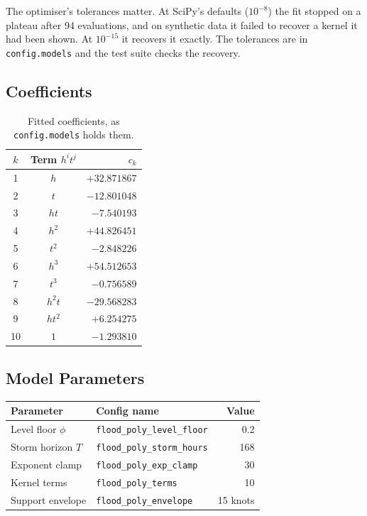 \documentclass[11pt,a4paper]{article}
\begin{document}
The optimiser's tolerances matter. At SciPy's defaults ($10^{-8}$) the fit stopped on a
plateau after 94 evaluations, and on synthetic data it failed to recover a kernel it
had been shown. At $10^{-15}$ it recovers it exactly. The tolerances are in
\texttt{config.models} and the test suite checks the recovery.

\subsection{Coefficients}
\begin{table}[ht]\centering\begin{tabular}{c|c|r}
$k$ & Term $h^i t^j$ & $c_k$ \\ \hline
1 & $h$ & $+32.871867$ \\
2 & $t$ & $-12.801048$ \\
3 & $h t$ & $-7.540193$ \\
4 & $h^2$ & $+44.826451$ \\
5 & $t^2$ & $-2.848226$ \\
6 & $h^3$ & $+54.512653$ \\
7 & $t^3$ & $-0.756589$ \\
8 & $h^2 t$ & $-29.568283$ \\
9 & $h t^2$ & $+6.254275$ \\
10 & $1$ & $-1.293810$ \\
\end{tabular}\caption{Fitted coefficients, as \texttt{config.models} holds them.}\label{tab:coeffs}\end{table}

\subsection{Model Parameters}
\begin{center}
\begin{tabular}{llr}
\toprule
\textbf{Parameter} & \textbf{Config name} & \textbf{Value} \\
\midrule
Level floor $\phi$ & \texttt{flood\_poly\_level\_floor} & 0.2 \\
Storm horizon $T$ & \texttt{flood\_poly\_storm\_hours} & 168 \\
Exponent clamp & \texttt{flood\_poly\_exp\_clamp} & 30 \\
Kernel terms & \texttt{flood\_poly\_terms} & 10 \\
Support envelope & \texttt{flood\_poly\_envelope} & 15 knots \\
\bottomrule
\end{tabular}
\end{center}
\end{document}

